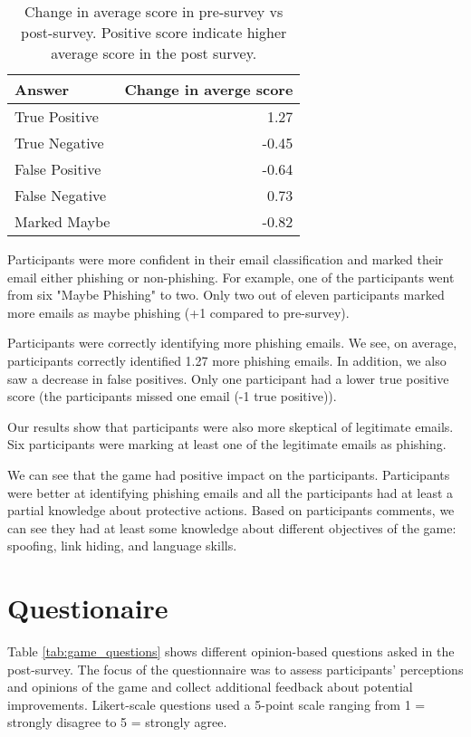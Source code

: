 \begin{table}[!ht]
    \centering
    \begin{tabular}{l r}
        \hline
        \textbf{Answer} & \textbf{Change in averge score} \\
        \hline
        True Positive   & 1.27                   \\
        True Negative   & -0.45                   \\
        False Positive  &   -0.64                \\
        False Negative  & 0.73                 \\
        Marked Maybe    & -0.82                  \\
    \end{tabular}
    \caption{Change in average score in pre-survey vs post-survey. Positive score indicate higher average score in the post survey.}
    \label{tab:pre_vs_post}
\end{table}

Participants were more confident in their email classification and marked their email either phishing or non-phishing. For example, one of the participants went from six "Maybe Phishing" to two. Only two out of eleven participants marked more emails as maybe phishing (+1 compared to pre-survey).

Participants were correctly identifying more phishing emails. We see, on average, participants correctly identified 1.27 more phishing emails. In addition, we also saw a decrease in false positives. Only one participant had a lower true positive score (the participants missed one email (-1 true positive)).

Our results show that participants were also more skeptical of legitimate emails. Six participants were marking at least one of the legitimate emails as phishing.

We can see that the game had positive impact on the participants. Participants were better at identifying phishing emails and all the participants had at least a partial knowledge about protective actions. Based on participants comments, we  can see they had at least some knowledge about different objectives of the game: spoofing, link hiding, and language skills.

\section{Questionaire}
Table \ref{tab:game_questions} shows different opinion-based questions asked in the post-survey. The focus of the questionnaire was to assess participants' perceptions and opinions of the game and collect additional feedback about potential improvements.  Likert-scale questions used a 5-point scale ranging from 1 = strongly disagree to 5 = strongly agree.

